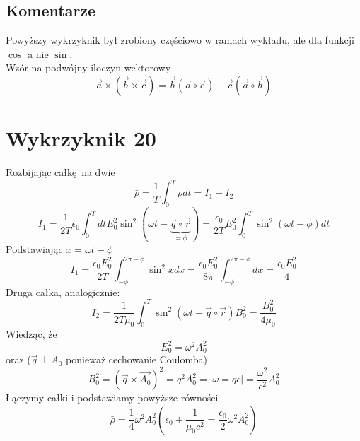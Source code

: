 \documentclass[a4paper,12pt]{article}
\begin{document}
\subsection{Komentarze}
	Powyższy wykrzyknik był zrobiony częściowo w ramach wykładu, ale dla funkcji $\cos$ a nie $\sin$.\\
	Wzór na podwójny iloczyn wektorowy
	$$
	\vec{a}\times(\vec{b}\times\vec{c}) = \vec{b}(\vec{a}\circ\vec{c}) - \vec{c}(\vec{a}\circ\vec{b})
	$$

\section{Wykrzyknik 20}
Rozbijając całkę na dwie
\begin{equation*}
  \bar{\rho} = \frac{1}{T} \int_0^T \rho dt = I_1 + I_2
\end{equation*}
\begin{equation*}
  I_1 = \frac{1}{2T}\epsilon_0 \int_0^T dt E_0^2 \sin^2 (\omega t -
  \underbrace{\vec{q} \circ \vec{r}}_{=\phi}) = \frac{\epsilon_0}{2T} E_0^2
  \int_0^T \sin^2 (\omega t - \phi) dt
\end{equation*}
Podstawiając $x = \omega t - \phi$
\begin{equation*}
  I_1 = \frac{\epsilon_0 E_0^2}{2T} \int_{-\phi}^{2\pi - \phi} \sin^2xdx =
  \frac{\epsilon_0 E_0^2}{8\pi} \int_{-\phi}^{2\pi-\phi} dx =
  \frac{\epsilon_0 E_0^2}{4}
\end{equation*}
Druga całka, analogicznie:
\begin{equation*}
  I_2 = \frac{1}{2T\mu_0} \int^T_0 \sin^2 (\omega t - \vec{q} \circ \vec{r}) B_0^2 =
  \frac{B_0^2}{4 \mu_0}
\end{equation*}
Wiedząc, że
\begin{equation*}
  E_0^2 = \omega^2 A_0^2
\end{equation*}
oraz ($\vec{q} \perp A_0$ ponieważ cechowanie Coulomba)
\begin{equation*}
  B_0^2 = \left( \vec{q} \times \vec{A_0} \right)^2 = q^2 A_0^2 = \bigg \vert
  \omega = qc \bigg \vert = \frac{\omega^2}{c^2}A_0^2
\end{equation*}
Łączymy całki i podstawiamy powyższe równości
\begin{equation*}
  \bar{\rho} = \frac{1}{4}\omega^2 A_0^2 \left(\epsilon_0 + \frac{1}{\mu_0 c^2}
    = \frac{\epsilon_0}{2} \omega^2 A_0^2\right) 
\end{equation*}
\end{document}
